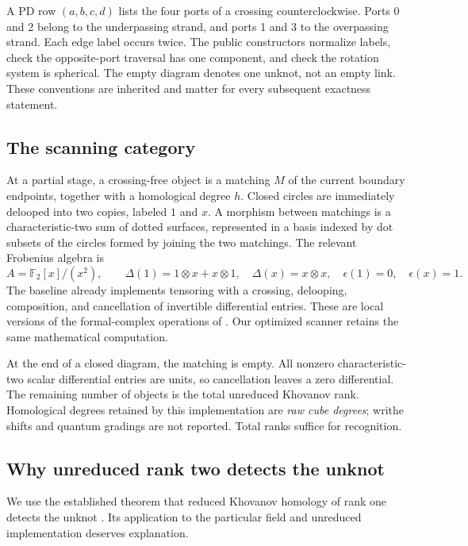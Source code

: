 \documentclass[11pt]{article}
\theoremstyle{definition}\newtheorem{definition}[theorem]{Definition}
\theoremstyle{remark}\newtheorem{remark}[theorem]{Remark}
\newcommand{\F}{\mathbb F_2}
\begin{document}
A PD row $(a,b,c,d)$ lists the four ports of a crossing counterclockwise.
Ports 0 and 2 belong to the underpassing strand, and ports 1 and 3 to the
overpassing strand. Each edge label occurs twice. The public constructors
normalize labels, check the opposite-port traversal has one component, and
check the rotation system is spherical. The empty diagram denotes one unknot,
not an empty link. These conventions are inherited and matter for every
subsequent exactness statement.

\subsection{The scanning category}

At a partial stage, a crossing-free object is a matching $M$ of the current
boundary endpoints, together with a homological degree $h$. Closed circles
are immediately delooped into two copies, labeled $1$ and $x$. A morphism
between matchings is a characteristic-two sum of dotted surfaces, represented
in a basis indexed by dot subsets of the circles formed by joining the two
matchings. The relevant Frobenius algebra is
\[
 A=\F[x]/(x^2),\qquad
 \Delta(1)=1\otimes x+x\otimes1,\quad
 \Delta(x)=x\otimes x,\quad
 \epsilon(1)=0,\quad\epsilon(x)=1.
\]
The baseline already implements tensoring with a crossing, delooping,
composition, and cancellation of invertible differential entries. These are
local versions of the formal-complex operations of \cite{BN}. Our optimized
scanner retains the same mathematical computation.

At the end of a closed diagram, the matching is empty. All nonzero
characteristic-two scalar differential entries are units, so cancellation
leaves a zero differential. The remaining number of objects is the total
unreduced Khovanov rank. Homological degrees retained by this implementation
are \emph{raw cube degrees}; writhe shifts and quantum gradings are not
reported. Total ranks suffice for recognition.

\subsection{Why unreduced rank two detects the unknot}

We use the established theorem that reduced Khovanov homology of rank one
detects the unknot \cite{KM}. Its application to the particular field and
unreduced implementation deserves explanation.
\end{document}
